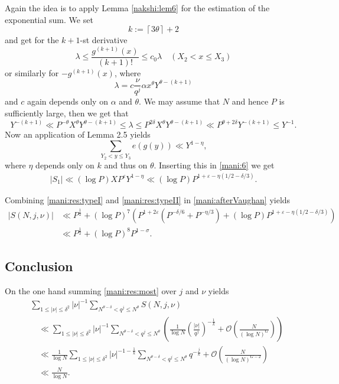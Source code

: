 \documentclass[a4paper,10pt]{amsart}
\numberwithin{equation}{section}
\theoremstyle{definition}
\theoremstyle{remark}
\newcommand{\lc}{\left\lceil}
\newcommand{\rc}{\right\rceil}
\renewcommand{\lvert}{\left\vert}
\renewcommand{\rvert}{\right\vert}
\begin{document}
Again the idea is to apply Lemma \ref{nakshi:lem6} for the estimation of the
exponential sum. We set
\[
k:=\lc 3\theta\rc +2
\]
and get for the $k+1$-st derivative 
\[
  \lambda\leq\frac{g^{(k+1)}(x)}{(k+1)!}\leq c_0\lambda\quad(X_2<x\leq X_3)
\]
or similarly for $-g^{(k+1)}(x)$, where
\[
\lambda=c\frac{\nu}{q^j}\alpha x^{\theta}Y^{\theta-(k+1)}
\]
and $c$ again depends only on $\alpha$ and $\theta$.
We may assume that $N$ and hence $P$ is sufficiently large, then we get that
\[
Y^{-(k+1)}\ll P^{-\theta}X^{\theta}Y^{\theta-(k+1)}\leq
\lambda\leq
P^{2\delta}X^{\theta}Y^{\theta-(k+1)}\ll P^{\theta+2\delta}Y^{-(k+1)}\leq Y^{-1}.
\]
Now an application of Lemma 2.5 yields
\[
\sum_{Y_2<y\leq Y_3}e(g(y))\ll Y^{1-\eta},
\]
where $\eta$ depends only on $k$ and thus on $\theta$. Inserting this in
\eqref{mani:6}  we get
\begin{gather}\label{mani:res:typeI}
  \lvert S_1\rvert \ll(\log P)XP^\varepsilon Y^{1-\eta}\ll(\log P)P^{1+\varepsilon-\eta(1/2-\delta/3)}.
\end{gather}

Combining \eqref{mani:res:typeI} and \eqref{mani:res:typeII} in
\eqref{mani:afterVaughan} yields
\begin{equation}\label{mani:res:least}
\begin{split}
\lvert S(N,j,\nu)\rvert
&\ll P^{\frac12}+\left(\log
  P\right)^7\left(P^{1+2\varepsilon}\left(P^{-\delta/6}+P^{-\eta/3}\right)+(\log
P)P^{1+\varepsilon-\eta(1/2-\delta/3)}\right)\\
&\ll P^{\frac12}+\left(\log P\right)^8P^{1-\sigma}.
\end{split}
\end{equation}

\subsection{Conclusion}
On the one hand summing \eqref{mani:res:most} over $j$ and $\nu$ yields
\begin{align*}
&\sum_{1\leq\lvert
  \nu\rvert\leq\delta^2}\lvert\nu\rvert^{-1}\sum_{N^{\theta-\delta}<q^{j}\leq
  N^{\theta}}
  S(N,j,\nu)\\
&\quad\ll\sum_{1\leq\lvert
  \nu\rvert\leq\delta^2}\lvert\nu\rvert^{-1}\sum_{N^{\theta-\delta}<q^{j}\leq
  N^{\theta}}
  \left(\frac1{\log N}\left(\frac{\lvert \nu\rvert}{q^j}\right)^{-\frac1k}
  +\mathcal{O}\left(\frac{N}{(\log N)^G}\right)\right)\\
&\quad\ll\frac1{\log N}\sum_{1\leq\lvert
  \nu\rvert\leq\delta^2}\lvert\nu\rvert^{-1-\frac1k}\sum_{N^{\theta-\delta}<q^{j}\leq
  N^{\theta}}q^{-\frac jk}
  +\mathcal{O}\left(\frac{N}{(\log N)^{G-2}}\right)\\
&\quad\ll\frac{N}{\log N}.
\end{align*}
\end{document}
